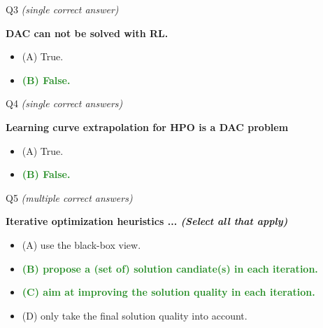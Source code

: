 \documentclass[main]{subfiles}
\newcommand{\correct}[1]{\textcolor{ForestGreen}{\textbf{#1} \checkmark}}
\newcommand{\wrong}[1]{#1}
\begin{document}
\begin{frame}{Q3 \hfill \small\normalfont\textit{(single correct answer)}}

\textbf{DAC can \textbf{not} be solved with RL.}

\begin{itemize}
    \item \wrong{(A) \; True.}
    \item \correct{(B) \; False.}
\end{itemize}

\end{frame}

\begin{frame}{Q4 \hfill \small\normalfont\textit{(single correct answers)}}

\textbf{Learning curve extrapolation for HPO is a DAC problem}

\begin{itemize}
    \item \wrong{(A) \; True.}
    \item \correct{(B) \; False.}
\end{itemize}

\end{frame}

\begin{frame}{Q5 \hfill \small\normalfont\textit{(multiple correct answers)}}

\textbf{Iterative optimization heuristics ... \textit{(Select all that apply)}}

\begin{itemize}
    \item \wrong{(A) \; use the black-box view.}
    \item \correct{(B) \; propose a (set of) solution candiate(s) in each iteration.}
    \item \correct{(C) \; aim at improving the solution quality in each iteration.}
    \item \wrong{(D) \; only take the final solution quality into account.}
\end{itemize}

\end{frame}
\end{document}
